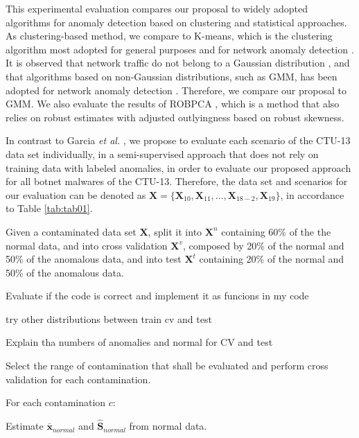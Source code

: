 \documentclass[review]{elsarticle}
\begin{document}
This experimental evaluation compares our proposal to widely adopted algorithms for anomaly detection based on clustering and statistical approaches. As clustering-based method, we compare to K-means, which is the clustering algorithm most adopted for general purposes and for network anomaly detection \cite{gaddam2007kmeans,moustafa2019holistic}. It is observed that network traffic do not belong to a Gaussian distribution \cite{benson2010network,moustafa2019holistic}, and that algorithms based on non-Gaussian distributions, such as GMM, has been adopted for network anomaly detection \cite{moustafa2019holistic}. Therefore, we compare our proposal to GMM. We also evaluate the results of ROBPCA \cite{hubert2005robpca}, which is a method that also relies on robust estimates with adjusted outlyingness based on robust skewness. 

In contrast to Garcia \emph{et al.} \cite{garcia2014empirical}, we propose to evaluate each scenario of the CTU-13 data set individually, in a semi-supervised approach that does not rely on training data with labeled anomalies, in order to evaluate our proposed approach for all botnet malwares of the CTU-13. Therefore, the data set and scenarios for our evaluation can be denoted as $\boldsymbol{X} = \{\boldsymbol{X}_{10}, \boldsymbol{X}_{11}, ... , \boldsymbol{X}_{18-2}, \boldsymbol{X}_{19}\}$, in accordance to Table \ref{tab:tab01}.

Given a contaminated data set $\boldsymbol{X}$, split it into $\boldsymbol{X}^n$ containing 60\% of the the normal data, and into cross validation $\boldsymbol{X}^v$, composed by 20\% of the normal and 50\% of the anomalous data, and into test $\boldsymbol{X}^t$ containing 20\% of the normal and 50\% of the anomalous data.












Evaluate if the code is correct and implement it as funcions in my code

try other distributions between train cv and test

Explain tha numbers of anomalies and normal for CV and test

Select the range of contamination that shall be evaluated and perform cross validation for each contamination. 

For each contamination $c$:

Estimate $\boldsymbol{\bar{x}}_{normal}$ and $\boldsymbol{\hat{S}}_{normal}$ from normal data.
\end{document}
